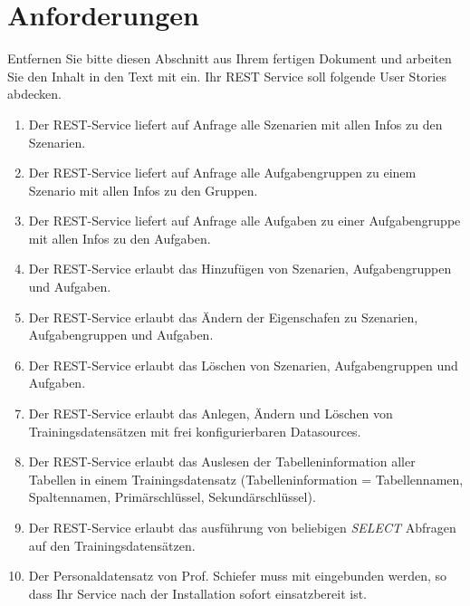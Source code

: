 \documentclass[fleqn,10pt,ngerman]{SelfArx}
\affiliation{\textit{Hochschule Kaiserslautern}} %
\affiliation{\textbf{Corresponding author}: max.mustermann@hs-kl.de} %
\begin{document}
	
	\flushbottom %
	
	\maketitle %
	
	\tableofcontents %
	
	\thispagestyle{empty} %
	
	
	\section*{Anforderungen}
	Entfernen Sie bitte diesen Abschnitt aus Ihrem fertigen Dokument und arbeiten Sie den Inhalt in den Text mit ein. 
	Ihr REST Service soll folgende User Stories abdecken.
	
	\begin{enumerate}
		
		\item Der REST-Service liefert auf Anfrage alle Szenarien mit allen Infos zu den Szenarien. 
		\item  Der REST-Service liefert auf Anfrage alle Aufgabengruppen zu einem Szenario mit allen Infos zu den Gruppen. 
		\item  Der REST-Service liefert auf Anfrage alle Aufgaben zu einer Aufgabengruppe mit allen Infos zu den Aufgaben. 
		\item  Der REST-Service erlaubt das Hinzufügen von Szenarien, Aufgabengruppen und Aufgaben.
		\item  Der REST-Service erlaubt das Ändern der Eigenschafen zu Szenarien, Aufgabengruppen und Aufgaben.
		\item  Der REST-Service erlaubt das Löschen von Szenarien, Aufgabengruppen und Aufgaben.
		\item  Der REST-Service erlaubt das Anlegen, Ändern und Löschen von Trainingsdatensätzen mit frei konfigurierbaren Datasources.
		\item  Der REST-Service erlaubt das Auslesen der Tabelleninformation aller Tabellen in einem Trainingsdatensatz (Tabelleninformation = Tabellennamen, Spaltennamen, Prim\"arschl\"ussel, Sekund\"arschl\"ussel).
		\item  Der REST-Service erlaubt das ausf\"uhrung von beliebigen 
		\textit{SELECT} Abfragen auf den Trainingsdatens\"atzen.
		\item Der Personaldatensatz von Prof. Schiefer muss mit eingebunden werden, so dass Ihr Service nach der Installation sofort einsatzbereit ist. 	
		
		
	\end{enumerate}
	
\end{document}
